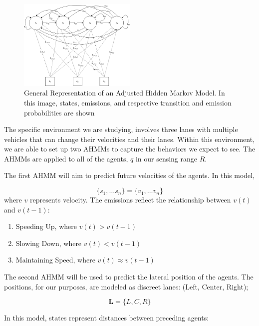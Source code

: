 \documentclass[conference]{IEEEtran}
\begin{document}
\begin{figure}[ht]
    \includegraphics[width=0.5\textwidth]{ahmm.png}
    \caption{General Representation of an Adjusted Hidden Markov Model. In this image, states, emissions, and respective transition and emission probabilities are shown}
    \label{fig:hmm}
\end{figure}

The specific environment we are studying, involves three lanes with multiple vehicles that can change their velocities and their lanes. Within this environment, we are able to set up two AHMMs to capture the behaviors we expect to see. The AHMMs are applied to all of the agents, $q$ in our sensing range $R$.

The first AHMM will aim to predict future velocities of the agents. In this model,

\begin{equation}
\{s_1,\ldots s_n\} = \{v_1,\ldots v_n\}
\end{equation}
    where $v$ represents velocity. The emissions reflect the relationship between $v(t)$ and $v(t-1)$:

\begin{enumerate}
    \item Speeding Up, where $v(t) > v(t-1)$
    \item Slowing Down, where $v(t) < v(t-1)$
    \item Maintaining Speed, where $v(t) \approx v(t-1)$
\end{enumerate}

The second AHMM will be used to predict the lateral position of the agents. The positions, for our purposes, are modeled as discreet lanes: (Left, Center, Right);

\begin{equation}
    \mathbf{L} = \{L,C,R\}
\end{equation}

In this model, states represent distances between preceding agents:
\end{document}
